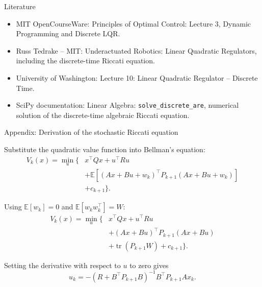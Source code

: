 \documentclass{beamer}
\begin{document}
\begin{frame}{Literature}
	\begin{itemize}
		
		\item MIT OpenCourseWare:
		{Principles of Optimal Control: Lecture 3, Dynamic Programming and Discrete LQR.}
		
		\item Russ Tedrake -- MIT:
		{Underactuated Robotics: Linear Quadratic Regulators, including the discrete-time Riccati equation.}
		
		\item University of Washington:
		{Lecture 10: Linear Quadratic Regulator -- Discrete Time.}
		
		\item SciPy documentation:
		{Linear Algebra: \texttt{solve\_discrete\_are}, numerical solution of the discrete-time algebraic Riccati equation.}
		
	\end{itemize}
\end{frame}


\myqrframe

\begin{frame}{Appendix: Derivation of the stochastic Riccati equation}
	\begin{flushleft}
	Substitute the quadratic value function into Bellman's equation:
	\[
	\begin{aligned}
		V_k(x)=\min_u\big\{&
		x^\top Qx+u^\top Ru\\
		&+\mathbb{E}[
		(Ax+Bu+w_k)^\top P_{k+1}
		(Ax+Bu+w_k)]\\
		&+c_{k+1}\big\}.
	\end{aligned}
	\]
	
	Using $\mathbb{E}[w_k]=0$ and
	$\mathbb{E}[w_kw_k^\top]=W$:
	\[
	\begin{aligned}
		V_k(x)=\min_u\big\{&
		x^\top Qx+u^\top Ru\\
		&+(Ax+Bu)^\top P_{k+1}(Ax+Bu)\\
		&+\operatorname{tr}(P_{k+1}W)+c_{k+1}
		\big\}.
	\end{aligned}
	\]
	
	
	Setting the derivative with respect to $u$ to zero gives
	\[
	u_k=-(R+B^\top P_{k+1}B)^{-1}
	B^\top P_{k+1}Ax_k.
	\]

		\end{flushleft}
\end{frame}
\end{document}
